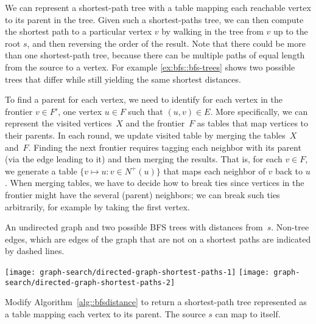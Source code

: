 We can represent a shortest-path tree with a table mapping each
reachable vertex to its parent in the tree.
%
Given such a shortest-paths tree, we can then compute the shortest path to a
particular vertex $v$ by walking in the tree from $v$ up to the
root $s$, and then reversing the order of the result.
%
Note that there could be more than one shortest-path tree, because
there can be multiple paths of equal length from the source to a vertex.  For example
\ref{ex:bfs::bfs-trees} shows two possible trees that differ while
still yielding the same shortest distances.

\begin{notesonly}
To find a parent for each vertex, we need to identify for each vertex
in the frontier $v \in F'$, one vertex $u \in F$ such that $(u,v) \in
E$.
%
More specifically, we can represent the visited vertices~$X$ and the
frontier~$F$ as tables that map vertices to their parents.  
%
In each round, we update visited table by merging the tables~$X$
and~$F$. Finding the next frontier requires tagging each neighbor with
its parent (via the edge leading to it) and then merging the results.
%
That is, for each $v \in F$, we generate a table $\{v \mapsto u : v
\in N^+(u)\}$ that maps each neighbor of $v$ back to $u$.  
%
When merging tables, we have to decide how to break ties since
vertices in the frontier might have the several (parent) neighbors; we
can break such ties arbitrarily, for example by taking the first
vertex.
\end{notesonly}

\begin{example}
\label{ex:bfs::bfs-trees}
An undirected graph and two possible BFS trees with distances
from~$s$. Non-tree edges, which are edges of the graph that are not on
a shortest paths are indicated by dashed lines.

\begin{center}
\texttt{[image: graph-search/directed-graph-shortest-paths-1]}
\hfill
\texttt{[image: graph-search/directed-graph-shortest-paths-2]}
\end{center}

\end{example}

\begin{exercise}
  Modify Algorithm~\ref{alg::bfsdistance} to return a shortest-path
  tree represented as a table mapping each vertex to its parent.
  The source $s$ can map to itself.
\end{exercise}

